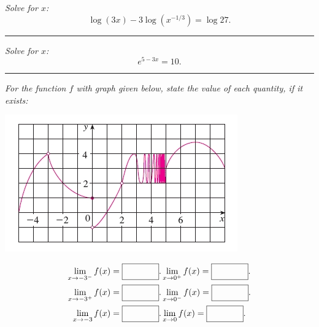\documentclass[12pt]{article}
\begin{document}
\bigskip
{\problem[5 pts] \em Solve for $x$:} \begin{equation*}\log (3x) - 3 \log (x^{-1/3}) =
  \log 27.\end{equation*}
\vspace{2cm}
\begin{flushright}
\end{flushright}
\hrule
{\problem[5 pts] \em Solve for $x$:} 
\begin{equation*}e^{5-3x} = 10.\end{equation*}
\vspace{2cm}
\begin{flushright}
\end{flushright}
\hrule
{\problem[10 pts] \em For the function $f$ with graph given below, state the value of each quantity, if it exists:}
\begin{center} 
\includegraphics[width=0.5\linewidth]{gftest1}
\end{center}
\begin{eqnarray*}
\lim_{x\to -3^-} f(x)= \fbox{\hspace{0.5in}\strut}. & \lim_{x\to 0^+} f(x)= \fbox{\hspace{0.5in}\strut}. \\
\lim_{x\to -3^+} f(x)= \fbox{\hspace{0.5in}\strut}. & \lim_{x\to 0^-} f(x)=\fbox{\hspace{0.5in}\strut}. \\
\lim_{x\to -3} f(x)  = \fbox{\hspace{0.5in}\strut}.& \lim_{x \to 0} f(x)= \fbox{\hspace{0.5in}\strut}.
\end{eqnarray*}
\end{document}
